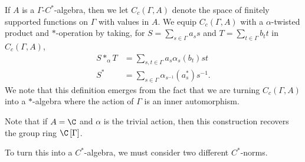\documentclass[10pt]{mypackage}
\begin{document}
If $A$ is a $\Gamma$-$C^{\ast}$-algebra, then we let $C_c\left( \Gamma,A \right)$ denote the space of finitely supported functions on $\Gamma$ with values in $A$. We equip $C_c\left( \Gamma,A \right)$ with a $\alpha$-twisted product and $\ast$-operation by taking, for $S = \sum_{s\in \Gamma}a_s s$ and $T = \sum_{t\in \Gamma}b_t t$ in $C_c\left( \Gamma,A \right)$,
\begin{align*}
  S\ast_{\alpha}T &= \sum_{s,t\in\Gamma}a_s\alpha_s\left( b_t \right)st\\
  S^{\ast} &= \sum_{s\in\Gamma}\alpha_{s^{-1}}\left( a_s^{\ast} \right)s^{-1}.
\end{align*}
We note that this definition emerges from the fact that we are turning $C_c\left( \Gamma,A \right)$ into a $\ast$-algebra where the action of $\Gamma$ is an inner automorphism.

Note that if $A = \C$ and $\alpha$ is the trivial action, then this construction recovers the group ring $\C\left[ \Gamma \right]$.

To turn this into a $C^{\ast}$-algebra, we must consider two different $C^{\ast}$-norms.
\end{document}
